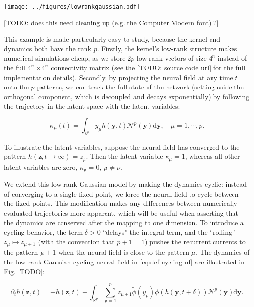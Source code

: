 \documentclass[10pt,letterpaper]{article}
\def\R{\mathbb R}
\def\Rp{\R^p}
\renewcommand{\vec}[1]{\boldsymbol{#1}}
\begin{document}
\texttt{[image: ../figures/lowrankgaussian.pdf]}

[TODO: does this need cleaning up (e.g. the Computer Modern font) ?]
\endif

This example is made particularly easy to study, because the kernel and dynamics both have the rank $p$. Firstly, the kernel's low-rank structure makes numerical simulations cheap, as we store $2p$ low-rank vectors of size $4^n$ instead of the full $4^n \times 4^n$ connectivity matrix (see the [TODO: source code url] for the full implementation details). Secondly, by projecting the neural field at any time $t$ onto the $p$ patterns, we can track the full state of the network (setting aside the orthogonal component, which is decoupled and decays exponentially) by following the trajectory in the latent space with the latent variables:

\begin{equation} \label{eq:def-kappa}
\kappa_\mu(t) = \int_{\Rp} y_\mu h(\vec y, t) \mathcal N^p(\vec y) \mathrm d \vec y,\quad \mu=1,\cdots,p.
\end{equation}

To illustrate the latent variables, suppose the neural field has converged to the pattern $h(\vec z, t \to \infty) = z_\mu$. Then the latent variable $\kappa_\mu = 1$, whereas all other latent variables are zero, $\kappa_\mu=0,\,\mu\neq\nu$.

We extend this low-rank Gaussian model by making the dynamics cyclic: instead of converging to a single fixed point, we force the neural field to cycle between the fixed points. This modification makes any differences between numerically evaluated trajectories more apparent, which will be useful when asserting that the dynamics are conserved after the mapping to one dimension. To introduce a cycling behavior, the term $\delta > 0$ ``delays'' the integral term, and the ``rolling'' $z_\mu \mapsto z_{\mu+1}$ (with the convention that $p+1=1$) pushes the recurrent currents to the pattern $\mu+1$ when the neural field is close to the pattern $\mu$. The dynamics of the low-rank Gaussian cycling neural field in \autoref{eq:def-cycling-nf} are illustrated in Fig. [TODO]:

\begin{equation} \label{eq:def-cycling-nf}
\partial_t h(\vec z, t) = -h(\vec z, t) + \int_{\Rp} \sum_{\mu=1}^p z_{\mu+1} \tilde\phi(y_\mu) \phi(h(\vec y, t+\delta)) \mathcal N^p(\vec y) \mathrm d \vec y.
\end{equation}
\end{document}
